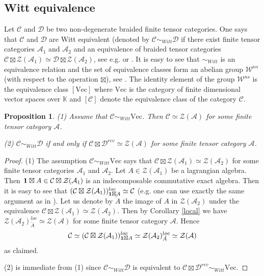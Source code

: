 \documentclass{amsart}
\newtheorem{proposition}[theorem]{Proposition}
\theoremstyle{definition}
\newcommand{\C}{\mathcal{C}}
\newcommand{\D}{\mathcal{D}}
\newcommand{\W}{\mathcal{W}}
\newcommand{\K}{\mathbb{K}}
\newcommand{\cZ}{\mathcal{Z}}
\newcommand{\A}{\mathcal{A}}
\newcommand{\be}{{\bf 1}}
\numberwithin{equation}{section}
\begin{document}
\subsection{Witt equivalence}
Let $\C$ and $\D$ be two non-degenerate braided finite tensor categories. One says
that $\C$ and $\D$ are Witt equivalent (denoted by $\C\sim_{Witt}\D$ if there exist
finite tensor categories $\A_1$ and $\A_2$ and an equivalence of braided tensor
categories $\C\boxtimes \cZ(\A_1)\simeq \D \boxtimes \cZ(\A_2)$, see e.g. 
\cite[Definition 7.2]{ShYa} or \cite[Definition 6.23]{LaWa}. 
It is easy to see that $\sim_{Witt}$ is an equivalence relation
and the set of equivalence classes form an abelian group $\W^{ns}$ (with respect to
the operation $\boxtimes$), see \cite[Lemma 7.3]{ShYa}. The identity element 
of the group $\W^{ns}$ is the equivalence class $[\mbox{Vec}]$ where $\mbox{Vec}$ is
the category of finite dimensional vector spaces over $\K$ and $[\C]$ denote the equivalence
class of the category $\C$.

\begin{proposition}\label{witt}
    (1) Assume that $\C\sim_{Witt}\mbox{Vec}$. Then $\C \simeq \cZ(\A)$ for some finite
    tensor category $\A$.

    (2) $\C \sim_{Witt}\D$ if and only if $\C \boxtimes \D^{rev}\simeq \cZ(\A)$
    for some finite tensor category $\A$.
\end{proposition}

\begin{proof}
    (1) The assumption $\C\sim_{Witt}\mbox{Vec}$ says that $\C \boxtimes \cZ(\A_1)\simeq \cZ(\A_2)$ for some finite tensor categories $\A_1$ and $\A_2$. Let $A\in \cZ(\A_1)$
    be a lagrangian algebra. Then $\be \boxtimes A\in \C \boxtimes \cZ(\A_1)$ is an indecomposable commutative exact algebra. Then it is easy to see that
    $(\C \boxtimes \cZ(\A_1))_{\be \boxtimes A}^{loc}\simeq \C$ (e.g. one can use
    exactly the same argument as in \cite[Proposition 5.8]{DMNO}). Let us denote
    by $\tilde A$ the image of $A$ in $\cZ(\A_2)$ under the equivalence
    $\C \boxtimes \cZ(\A_1)\simeq \cZ(\A_2)$. Then by Corollary \ref{local} we have
    $\cZ(\A_2)_{\tilde A}^{loc}\simeq \cZ(\A)$ for some finite tensor category $\A$.
    Hence
    $$\C \simeq (\C \boxtimes \cZ(\A_1))_{\be \boxtimes A}^{loc}\simeq \cZ(\A_2)_{\tilde A}^{loc}\simeq \cZ(\A)$$
    as claimed.

    (2) is immediate from (1) since $\C \sim_{Witt}\D$ is equivalent to $\C \boxtimes \D^{rev}\sim_{Witt}\mbox{Vec}$.
\end{proof}
\end{document}
